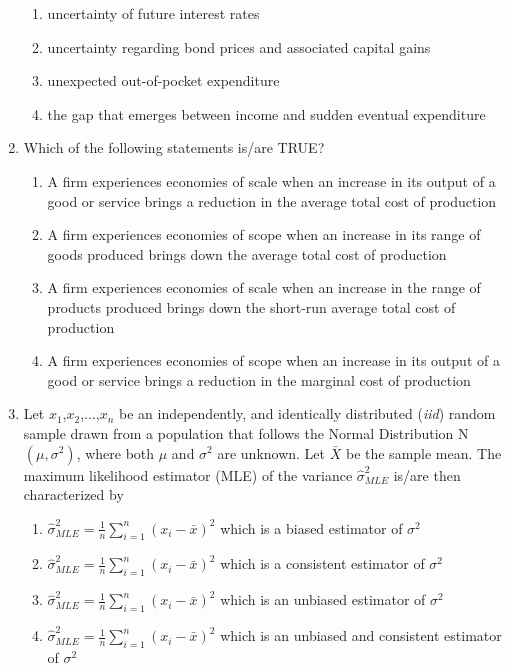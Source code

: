 \documentclass{article}
\begin{document}
\begin{enumerate}[leftmargin=*, start=27, label=Q.\arabic*.]
    \begin{enumerate}
        \item uncertainty of future interest rates
        \item  uncertainty regarding bond prices and associated capital gains
        \item unexpected out-of-pocket expenditure
        \item the gap that emerges between income and sudden eventual expenditure
    \end{enumerate}

    \item Which of the following statements is/are TRUE?
    
    \begin{enumerate}
        \item A firm experiences economies of scale when an increase in its output of a good or service brings a reduction in the average total cost of production
        \item  A firm experiences economies of scope when an increase in its range of goods produced brings down the average total cost of production
        \item A firm experiences economies of scale when an increase in the range of products produced brings down the short-run average total cost of production
        \item A firm experiences economies of scope when an increase in its output of a good or service brings a reduction in the marginal cost of production
    \end{enumerate}

    \item Let $x_1$,$x_2$,...,$x_n$ be an independently, and identically distributed (\textit{iid}) random sample drawn from a population that follows the Normal Distribution N $(\mu, \sigma^2)$, where both $\mu$ and $\sigma^2$ are unknown. Let $\bar{X}$ be the sample mean. The maximum likelihood estimator (MLE) of the variance $\hat{\sigma}^2_{MLE}$ is/are then characterized by
    
    \begin{enumerate}
        \item $\hat{\sigma}^2_{MLE} =\frac{1}{n}\sum_{i=1}^{n}(x_i-\bar{x})^2$ which is a biased estimator of $\sigma^2$
        \item $\hat{\sigma}^2_{MLE} =\frac{1}{n}\sum_{i=1}^{n}(x_i-\bar{x})^2$ which is a consistent estimator of $\sigma^2$
        \item $\hat{\sigma}^2_{MLE} =\frac{1}{n}\sum_{i=1}^{n}(x_i-\bar{x})^2$ which is an unbiased estimator of $\sigma^2$
        \item $\hat{\sigma}^2_{MLE} =\frac{1}{n}\sum_{i=1}^{n}(x_i-\bar{x})^2$ which is an unbiased and consistent estimator of $\sigma^2$
    \end{enumerate}


\end{enumerate}
\end{document}
